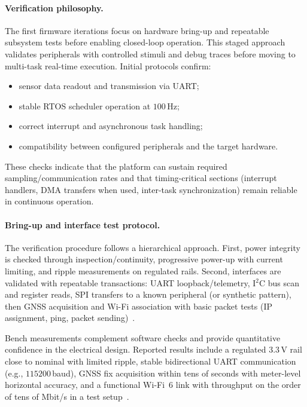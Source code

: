\paragraph{Verification philosophy.}
The first firmware iterations focus on hardware bring-up and repeatable subsystem tests before enabling closed-loop operation.
This staged approach validates peripherals with controlled stimuli and debug traces before moving to multi-task real-time execution.
Initial protocols confirm:
\begin{itemize}
	\item sensor data readout and transmission via UART;
	\item stable RTOS scheduler operation at $100\,\mathrm{Hz}$;
	\item correct interrupt and asynchronous task handling;
	\item compatibility between configured peripherals and the target hardware.
\end{itemize}
These checks indicate that the platform can sustain required sampling/communication rates and that timing-critical sections (interrupt handlers, DMA transfers when used, inter-task synchronization) remain reliable in continuous operation.

\paragraph{Bring-up and interface test protocol.}
The verification procedure follows a hierarchical approach.
First, power integrity is checked through inspection/continuity, progressive power-up with current limiting, and ripple measurements on regulated rails.
Second, interfaces are validated with repeatable transactions: UART loopback/telemetry, I$^2$C bus scan and register reads, SPI transfers to a known peripheral (or synthetic pattern), then GNSS acquisition and Wi-Fi association with basic packet tests (IP assignment, ping, packet sending)~\cite{chaix2026vehalsecu}.

Bench measurements complement software checks and provide quantitative confidence in the electrical design.
Reported results include a regulated $3.3\,\mathrm{V}$ rail close to nominal with limited ripple, stable bidirectional UART communication (e.g., $115200$\,baud), GNSS fix acquisition within tens of seconds with meter-level horizontal accuracy, and a functional Wi-Fi~6 link with throughput on the order of tens of Mbit/s in a test setup~\cite{chaix2026vehalsecu}.

